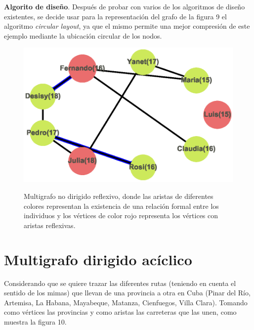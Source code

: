 \documentclass{article}
\begin{document}
\textbf{Algorito de diseño}.\linebreak
Después de probar con varios de los algoritmos de diseño existentes, se decide usar para la representación del grafo de la figura 9 el algoritmo \textit{circular layout}, ya que el mismo permite una mejor compresión de este ejemplo mediante la ubicación circular de los nodos.

\begin{center}

\end{center}
\begin{figure}[h]
\begin{center}
\includegraphics[scale=0.7]{Graf9_circular_layout.eps}\\
\caption{Multigrafo no dirigido reflexivo, donde las aristas de diferentes colores representan la existencia de una relación formal entre los individuos y los vértices de color rojo representa los vértices con aristas reflexivas.}
\end{center}
\end{figure}
\section{Multigrafo dirigido acíclico}
Considerando que se quiere trazar las diferentes rutas (teniendo en cuenta el sentido de los mimas) que llevan de una provincia a otra en Cuba (Pinar del Río, Artemisa, La Habana, Mayabeque, Matanza, Cienfuegos, Villa Clara). Tomando como vértices las provincias y como aristas las carreteras que las unen, como muestra la figura 10.\linebreak
\end{document}
